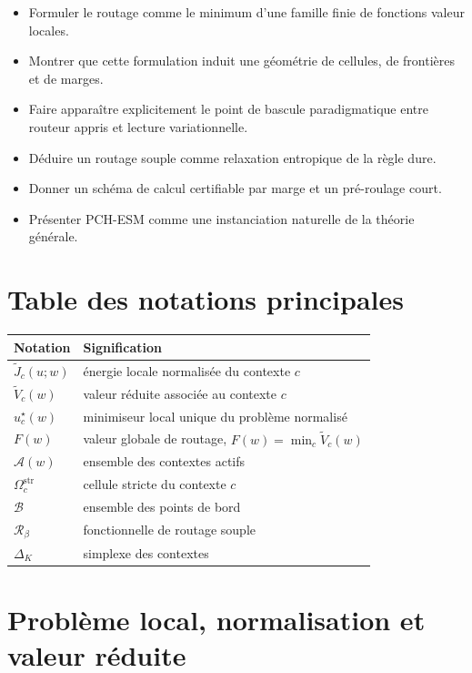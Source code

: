 \documentclass[11pt,a4paper]{article}
\newcommand{\Rcal}{\mathcal R}
\newcommand{\Acal}{\mathcal A}
\newcommand{\Bcal}{\mathcal B}
\begin{document}
\begin{itemize}[leftmargin=2em]
    \item Formuler le routage comme le minimum d'une famille finie de fonctions valeur locales.
    \item Montrer que cette formulation induit une géométrie de cellules, de frontières et de marges.
    \item Faire apparaître explicitement le point de bascule paradigmatique entre routeur appris et lecture variationnelle.
    \item Déduire un routage souple comme relaxation entropique de la règle dure.
    \item Donner un schéma de calcul certifiable par marge et un pré-roulage court.
    \item Présenter PCH-ESM comme une instanciation naturelle de la théorie générale.
\end{itemize}

\section*{Table des notations principales}
\begin{center}
\begin{tabular}{@{}ll@{}}
\toprule
Notation & Signification \\ \midrule
\(\widetilde J_c(u;w)\) & énergie locale normalisée du contexte \(c\) \\
\(\widetilde V_c(w)\) & valeur réduite associée au contexte \(c\) \\
\(u_c^\star(w)\) & minimiseur local unique du problème normalisé \\
\(F(w)\) & valeur globale de routage, \(F(w)=\min_c \widetilde V_c(w)\) \\
\(\Acal(w)\) & ensemble des contextes actifs \\
\(\Omega_c^{\mathrm{str}}\) & cellule stricte du contexte \(c\) \\
\(\Bcal\) & ensemble des points de bord \\
\(\Rcal_\beta\) & fonctionnelle de routage souple \\
\(\Delta_K\) & simplexe des contextes \\
\bottomrule
\end{tabular}
\end{center}

\section{Problème local, normalisation et valeur réduite}
\end{document}

